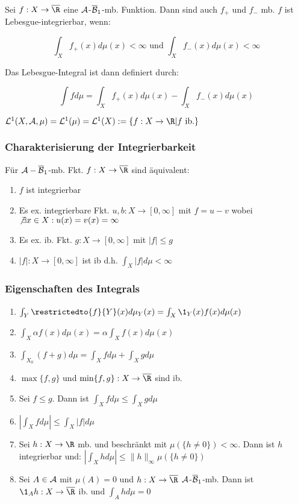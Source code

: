 Sei $f : X \to \overline\R$ eine $\mathcal{A}$-$\overline{\mathcal{B}}_1$-mb. Funktion. Dann sind auch $f_+$ und $f_-$ mb. $f$ ist Lebesgue-integrierbar, wenn:

\vspace{-4mm}
$$\int_X f_+(x) d\mu(x) < \infty \text{ und } \int_X f_-(x) d\mu(x) < \infty$$

Das Lebesgue-Integral ist dann definiert durch:

$$\int f d\mu = \int_X f_+(x) d\mu(x) - \int_X f_-(x) d\mu(x)$$

$\L^1(X,\A,\mu) = \L^1(\mu) = \L^1(X) := \{ f : X \to \R | f \text{ ib.}\}$

\subsubsection*{Charakterisierung der Integrierbarkeit}

Für $\mathcal{A}-\overline{\mathcal{B}}_1$-mb. Fkt. $f : X \to \overline\R$ sind äquivalent:

\begin{enumerate}[label=(\alph*)]
	\item $f$ ist integrierbar
	\item Es ex. integrierbare Fkt. $u, b : X \to [0,\infty]$ mit $f=u-v$ wobei $\not\exists x \in X : u(x)=v(x)=\infty$
	\item Es ex. ib. Fkt. $g : X \to [0,\infty]$ mit $|f| \leq g$
	\item $|f| : X \to [0,\infty]$ ist ib d.h. $\int_X |f| d\mu < \infty$
\end{enumerate}

\subsubsection*{Eigenschaften des Integrals}

\begin{enumerate}[label=(\alph*)]
	\item $\int_Y \restrictedto{f}{Y}(x) d\mu_Y(x) = \int_X \1_Y(x) f(x) d\mu(x)$
	\item $\int_X \alpha f(x) d\mu(x) = \alpha \int_X f(x) d\mu(x)$
	\item $\int_{X_0} (f + g) d\mu = \int_X f d\mu + \int_X g d\mu$
	\item $\max\{f,g\}$ und $\min\{f,g\} : X \to \overline\R$ sind ib.
	\item Sei $f \leq g$. Dann ist $\int_X f d\mu \leq \int_X g d\mu$
	\item $|\int_X f d\mu| \leq \int_X |f| d\mu$
	\item Sei $h : X \to \R$ mb. und beschränkt mit $\mu(\{h \neq 0\}) < \infty$. Dann ist $h$ integrierbar und: $|\int_X h d\mu| \leq \|h\|_\infty \mu(\{h \neq 0\})$
	\item Sei $A \in \mathcal{A}$ mit $\mu(A) = 0$ und $h : X \to \overline\R$ $\mathcal{A}$-$\overline{\mathcal{B}}_1$-mb. Dann ist $\1_A h : X \to \overline\R$ ib. und $\int_A h d\mu = 0$
\end{enumerate}

